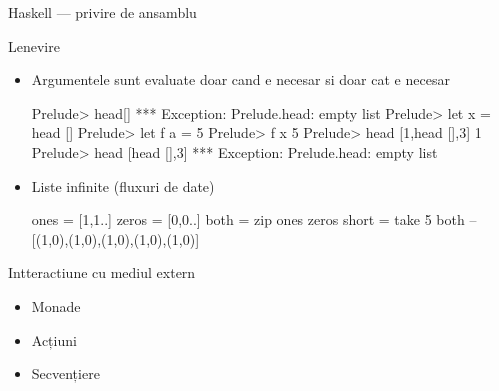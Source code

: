 \documentclass[xcolor=pdftex,romanian,colorlinks]{beamer}
\begin{document}
\begin{section}{Haskell --- privire de ansamblu}
\begin{frame}[fragile]{Lenevire}
\begin{itemize}
\item Argumentele sunt evaluate doar cand e necesar si doar cat e necesar
\begin{asciihs}
Prelude> head[]
*** Exception: Prelude.head: empty list
Prelude> let x = head []
Prelude> let f a = 5
Prelude> f x
5
Prelude> head [1,head [],3]
1
Prelude> head [head [],3]
*** Exception: Prelude.head: empty list
\end{asciihs}
\item Liste infinite (fluxuri de date)
\begin{asciihs}
ones = [1,1..]
zeros = [0,0..]
both = zip ones zeros
short = take 5 both   -- [(1,0),(1,0),(1,0),(1,0),(1,0)]
\end{asciihs}
\end{itemize}
\end{frame}

\begin{frame}{Intteractiune cu mediul extern}
\begin{itemize}
\item Monade
\item Acțiuni
\item Secvențiere
\end{itemize}
\end{frame}

\end{section}
\end{document}
